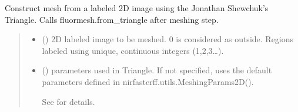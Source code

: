 \documentclass[letterpaper,10pt,english]{sphinxmanual}
\begin{document}
\begin{fulllineitems}
\begin{fulllineitems}
\label{\detokenize{_autosummary/nirfasterff.base.fluor_mesh.fluormesh:nirfasterff.base.fluor_mesh.fluormesh.from_image}}
\pysigstartsignatures
\pysiglinewithargsret
{}
{\sphinxparamcomma {}\sphinxparamcomma {}\sphinxparamcomma {}\sphinxparamcomma {}\sphinxparamcomma {}}
{}
\pysigstopsignatures
\sphinxAtStartPar
Construct mesh from a labeled 2D image using the Jonathan Shewchuk’s Triangle. Calls fluormesh.from\_triangle after meshing step.
\begin{quote}\begin{description}
\begin{itemize}
\item {} 
\sphinxAtStartPar
{} (\sphinxstyleliteralemphasis{\sphinxupquote{ (}}\sphinxstyleliteralemphasis{\sphinxupquote{) }}) \textendash{} 2D labeled image to be meshed. 0 is considered as outside. Regions labeled using unique, continuous integers (1,2,3…).

\item {} 
\sphinxAtStartPar
{} ({\hyperref[\detokenize{_autosummary/nirfasterff.utils.MeshingParams2D:nirfasterff.utils.MeshingParams2D}]{}}\sphinxstyleliteralemphasis{\sphinxupquote{, }}) \textendash{} 
\sphinxAtStartPar
parameters used in Triangle. If not specified, uses the default parameters defined in nirfasterff.utils.MeshingParams2D().

\sphinxAtStartPar
See {\hyperref[\detokenize{_autosummary/nirfasterff.utils.MeshingParams2D:nirfasterff.utils.MeshingParams2D}]{}} for details.



\end{itemize}
\end{description}
\end{quote}
\end{fulllineitems}
\end{fulllineitems}
\end{document}
